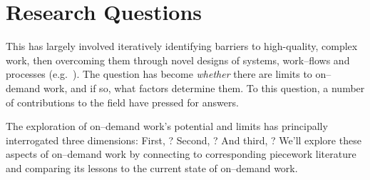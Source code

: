 \documentclass[trackingWork]{subfiles}
\begin{document}
\section{Research Questions}

This has largely involved iteratively
identifying barriers to high-quality, complex work, then
overcoming them through novel designs of systems, work--flows and processes (e.g.~\cite{bernsteinSoylent,foundry,crowdForgeKittur}).
The question 
has become \textit{whether} there are limits to on--demand work,
and if so, what factors determine them.
To this question, a number of contributions to the field have pressed for answers.

The exploration of on--demand work's potential and limits has principally 
interrogated three dimensions:
First, ?
Second, ?
And third, ?
We'll explore these aspects of on--demand work by connecting to corresponding piecework literature
and comparing its lessons to the current state of on--demand work.


\notinsubfile{
  
  
  
}

\onlyinsubfile{
  \printbibliography{}
}
\end{document}
